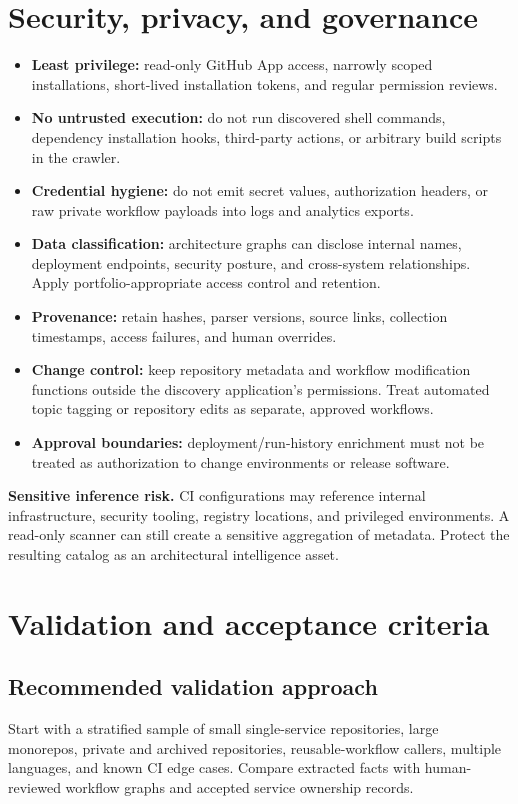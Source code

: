 \documentclass[11pt,letterpaper]{article}
\newcommand{\term}[1]{\textbf{\color{Navy}#1}}
\begin{document}
\section{Security, privacy, and governance}
\begin{itemize}
\item \term{Least privilege:} read-only GitHub App access, narrowly scoped installations, short-lived installation tokens, and regular permission reviews.
\item \term{No untrusted execution:} do not run discovered shell commands, dependency installation hooks, third-party actions, or arbitrary build scripts in the crawler.
\item \term{Credential hygiene:} do not emit secret values, authorization headers, or raw private workflow payloads into logs and analytics exports.
\item \term{Data classification:} architecture graphs can disclose internal names, deployment endpoints, security posture, and cross-system relationships. Apply portfolio-appropriate access control and retention.
\item \term{Provenance:} retain hashes, parser versions, source links, collection timestamps, access failures, and human overrides.
\item \term{Change control:} keep repository metadata and workflow modification functions outside the discovery application's permissions. Treat automated topic tagging or repository edits as separate, approved workflows.
\item \term{Approval boundaries:} deployment/run-history enrichment must not be treated as authorization to change environments or release software.
\end{itemize}

\begin{cautionbox}
\textbf{Sensitive inference risk.} CI configurations may reference internal infrastructure, security tooling, registry locations, and privileged environments. A read-only scanner can still create a sensitive aggregation of metadata. Protect the resulting catalog as an architectural intelligence asset.
\end{cautionbox}

\section{Validation and acceptance criteria}
\subsection{Recommended validation approach}
Start with a stratified sample of small single-service repositories, large monorepos, private and archived repositories, reusable-workflow callers, multiple languages, and known CI edge cases. Compare extracted facts with human-reviewed workflow graphs and accepted service ownership records.
\end{document}
